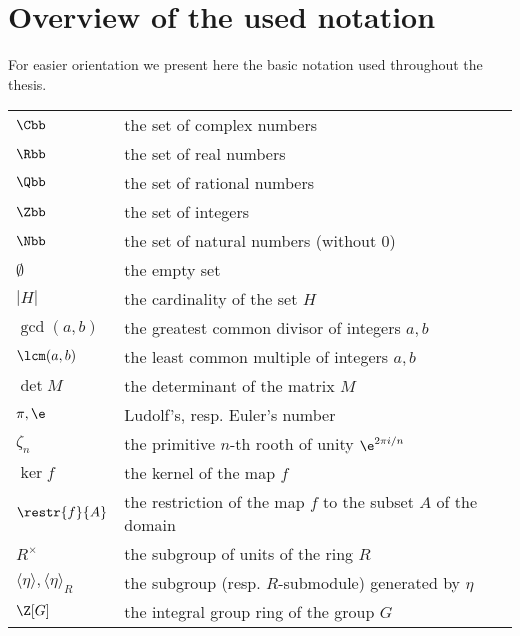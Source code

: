 \chapter*{Overview of the used notation}

For easier orientation we present here the basic notation used throughout the thesis.
\begin{flushleft}
\begin{longtable}[l]{ll} %
  $\Cbb$                 & the set of complex numbers \\[1mm]
  $\Rbb$                 & the set of real numbers \\[1mm]
  $\Qbb$                 & the set of rational numbers \\[1mm]
  $\Zbb$                 & the set of integers \\[1mm]
  $\Nbb$                 & the set of natural numbers (without $0$)\\[1mm]
  $\emptyset$                 & the empty set\\[1mm]
  $|H|$						& the cardinality of the set $H$  \\[1mm]
  $\gcd(a,b)$			& the greatest common divisor of integers $a,b$ \\[1mm]
  $\lcm(a,b)$			& the least common multiple of integers $a,b$ \\[1mm]
  $\det M$			& the determinant of the matrix $M$ \\[1mm]
  $\pi,\e$					  & Ludolf's, resp. Euler's number \\[1mm]
  $\zeta_n$                 & the primitive $n$-th rooth of unity $\e^{2\pi i/n}$ \\[1mm]
  $\ker f$                 & the kernel of the map $f$ \\[1mm]
  $\restr{f}{A}$		& the restriction of the map $f$ to the subset $A$ of the domain \\[1mm]
  $R^{\times}$		& the subgroup of units of the ring $R$ \\[1mm]
  $\langle \eta \rangle, \langle \eta \rangle_{R}$ & the subgroup (resp. $R$-submodule) generated by $\eta$ \\[1mm]
  $\Z[G]$					& the integral group ring of the group $G$ \\[1mm]

\end{longtable}
\end{flushleft}
